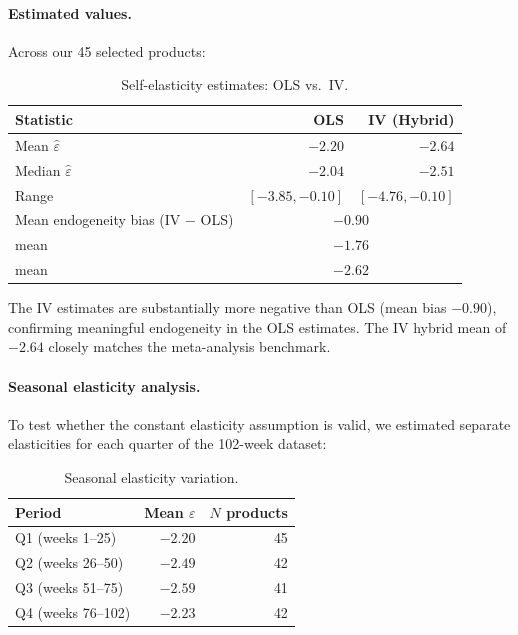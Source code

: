 \documentclass[11pt,a4paper]{article}
\begin{document}
\paragraph{Estimated values.}
Across our 45 selected products:
\begin{table}[H]
\centering
\caption{Self-elasticity estimates: OLS vs.\ IV.}
\begin{tabular}{@{}lrr@{}}
\toprule
\textbf{Statistic} & \textbf{OLS} & \textbf{IV (Hybrid)} \\
\midrule
Mean $\hat{\varepsilon}$ & $-2.20$ & $-2.64$ \\
Median $\hat{\varepsilon}$ & $-2.04$ & $-2.51$ \\
Range & $[-3.85, -0.10]$ & $[-4.76, -0.10]$ \\
\midrule
Mean endogeneity bias (IV $-$ OLS) & \multicolumn{2}{c}{$-0.90$} \\
\citet{tellis1988} mean & \multicolumn{2}{c}{$-1.76$} \\
\citet{bijmolt2005} mean & \multicolumn{2}{c}{$-2.62$} \\
\bottomrule
\end{tabular}
\end{table}

The IV estimates are substantially more negative than OLS (mean bias $-0.90$), confirming meaningful endogeneity in the OLS estimates.
The IV hybrid mean of $-2.64$ closely matches the \citet{bijmolt2005} meta-analysis benchmark.

\paragraph{Seasonal elasticity analysis.}
To test whether the constant elasticity assumption is valid, we estimated separate elasticities for each quarter of the 102-week dataset:
\begin{table}[H]
\centering
\caption{Seasonal elasticity variation.}
\begin{tabular}{@{}lrr@{}}
\toprule
\textbf{Period} & \textbf{Mean $\varepsilon$} & \textbf{$N$ products} \\
\midrule
Q1 (weeks 1--25) & $-2.20$ & 45 \\
Q2 (weeks 26--50) & $-2.49$ & 42 \\
Q3 (weeks 51--75) & $-2.59$ & 41 \\
Q4 (weeks 76--102) & $-2.23$ & 42 \\
\bottomrule
\end{tabular}
\end{table}
\end{document}
